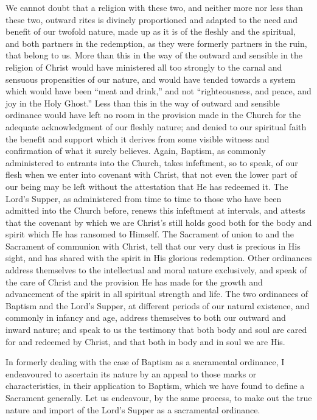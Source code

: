 \documentclass[english,]{book}
\begin{document}
We cannot doubt that a religion with these two, and neither more nor less than these two, outward rites is divinely proportioned and adapted to the need and benefit of our twofold nature, made up as it is of the fleshly and the spiritual, and both partners in the redemption, as they were formerly partners in the ruin, that belong to us. More than this in the way of the outward and sensible in the religion of Christ would have ministered all too strongly to the carnal and sensuous propensities of our nature, and would have tended towards a system which would have been ``meat and drink,'' and not ``righteousness, and peace, and joy in the Holy Ghost.'' Less than this in the way of outward and sensible ordinance would have left no room in the provision made in the Church for the adequate acknowledgment of our fleshly nature; and denied to our spiritual faith the benefit and support which it derives from some visible witness and confirmation of what it surely believes. Again, Baptism, as commonly administered to entrants into the Church, takes infeftment, so to speak, of our flesh when we enter into covenant with Christ, that not even the lower part of our being may be left without the attestation that He has redeemed it. The Lord's Supper, as administered from time to time to those who have been admitted into the Church before, renews this infeftment at intervals, and attests that the covenant by which we are Christ's still holds good both for the body and spirit which He has ransomed to Himself. The Sacrament of union to and the Sacrament of communion with Christ, tell that our very dust is precious in His sight, and has shared with the spirit in His glorious redemption. Other ordinances address themselves to the intellectual and moral nature exclusively, and speak of the care of Christ and the provision He has made for the growth and advancement of the spirit in all spiritual strength and life. The two ordinances of Baptism and the Lord's Supper, at different periods of our natural existence, and commonly in infancy and age, address themselves to both our outward and inward nature; and speak to us the testimony that both body and soul are cared for and redeemed by Christ, and that both in body and in soul we are His.

In formerly dealing with the case of Baptism as a sacramental ordinance, I endeavoured to ascertain its nature by an appeal to those marks or characteristics, in their application to Baptism, which we have found to define a Sacrament generally. Let us endeavour, by the same process, to make out the true nature and import of the Lord's Supper as a sacramental ordinance.
\end{document}
